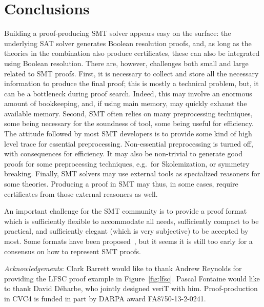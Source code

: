 \documentclass{llncs}
\begin{document}
\section{Conclusions}
\label{sec:concl}


Building a proof-producing SMT solver appears easy on the surface: the underlying SAT solver
generates Boolean resolution proofs, and, as long as the theories in the combination also
produce certificates, these can also be integrated using Boolean resolution.
There are, however, challenges both small and large related to SMT
proofs.  First, it is necessary to collect and store all the necessary
information to produce the final proof; this is mostly a technical problem, but,
it can be a bottleneck during proof search.  Indeed, this may involve an
enormous amount of bookkeeping, and, if using main memory, may quickly
exhaust the available memory.  Second, SMT often relies on many preprocessing
techniques, some being necessary for the soundness of tool, some being useful
for efficiency.  The attitude followed by most SMT developers is to provide some
kind of high level trace for essential preprocessing.  Non-essential
preprocessing is turned off, with consequences for efficiency.  It
may also be non-trivial to generate good proofs for some preprocessing
techniques, e.g.\ for Skolemization, or symmetry breaking.  Finally, SMT
solvers may use external tools as specialized reasoners for some
theories.
Producing a proof in SMT may thus, in some cases, require certificates from
those external reasoners as well.

An important challenge for the SMT community is to provide a proof format which
is sufficiently flexible to accommodate all needs, sufficiently compact to be
practical, and sufficiently elegant (which is very subjective) to be accepted by
most.  Some formats have been proposed~\cite{Besson1,dMB08,Reynolds1}, but it
seems it is still too early for a consensus on how to represent SMT proofs.


\medskip\noindent%
\emph{Acknowledgements}: Clark Barrett would like to thank Andrew Reynolds for
providing the LFSC proof example in Figure~\ref{fig:lfsc}.  Pascal Fontaine
would like to thank David D\'{e}harbe, who jointly designed veriT with him.
Proof-production in CVC4 is funded in part by DARPA award FA8750-13-2-0241.




\end{document}
